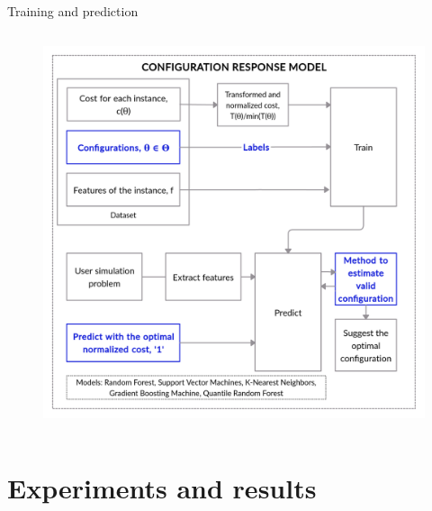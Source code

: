 \documentclass[10pt]{beamer}
\begin{document}
\begin{frame}[t, noframenumbering]{Training and prediction}
\begin{columns}[T]
{\begin{column}{.5\textwidth}
\begin{figure}[!ht]
\includegraphics[width=\linewidth]{images/configuration_response_new.jpg}
\captionsetup{justification=justified}
\label{fig:config_new}
\end{figure}
\end{column}}%
\end{columns}
\end{frame}


\section{Experiments and results}
\end{document}
